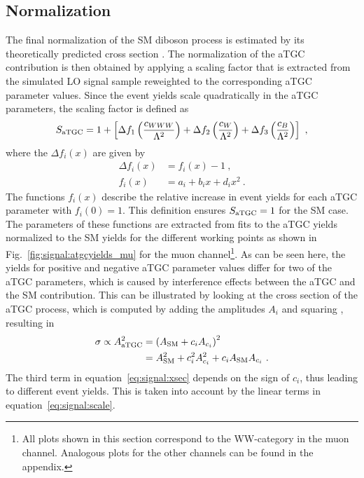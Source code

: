 \subsection*{Normalization}
The final normalization of the SM diboson process is estimated by its theoretically predicted cross section \cite{WWxsec,WZxsec}. The normalization of the aTGC contribution is then obtained by applying a scaling factor that is extracted from the simulated LO signal sample reweighted to the corresponding aTGC parameter values. Since the event yields scale quadratically in the aTGC parameters, the scaling factor is defined as
\begin{equation}
S_{\rm aTGC} = 1 + \left[ \Delta f_1\left(\frac{c_{WWW}}{\Lambda^2}\right) + \Delta f_2\left(\frac{c_{W}}{\Lambda^2}\right) + \Delta f_3\left(\frac{c_{B}}{\Lambda^2}\right) \right] ~,
\end{equation}
where the $\Delta f_i(x)$ are given by
\begin{align}
\Delta f_i(x) &= f_i(x)-1 ~, \\
f_i(x) &= a_i + b_i x + d_i x^2 ~. \label{eq:signal:scale}
\end{align}
The functions $f_i(x)$ describe the relative increase in event yields for each aTGC parameter with $f_i(0)=1$. This definition ensures $S_{\rm aTGC}=1$ for the SM case. The parameters of these functions are extracted from fits to the aTGC yields normalized to the SM yields for the different working points as shown in Fig.~\ref{fig:signal:atgcyields_mu} for the muon channel\footnote{All plots shown in this section correspond to the WW-category in the muon channel. Analogous plots for the other channels can be found in the appendix.}. As can be seen here, the yields for positive and negative aTGC parameter values differ for two of the aTGC parameters, which is caused by interference effects between the aTGC and the SM contribution. This can be illustrated by looking at the cross section of the aTGC process, which is computed by adding the amplitudes $A_i$ and squaring \cite{EFT}, resulting in
\begin{align}
\sigma \propto A_{\rm aTGC}^2 &= \left( A_{\rm SM} + c_i A_{c_i} \right)^2 \\
&= A_{\rm SM}^2 + c_i^2  A_{c_i}^2 + c_i  A_{\rm SM} A_{c_i} ~. \label{eq:signal:xsec} 
\end{align}
The third term in equation~\ref{eq:signal:xsec} depends on the sign of $c_i$, thus leading to different event yields. This is taken into account by the linear terms in equation~\ref{eq:signal:scale}.
